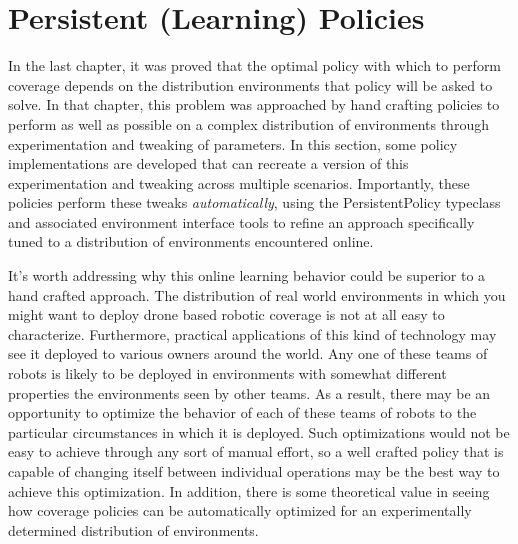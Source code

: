 
\section{Persistent (Learning) Policies}

In the last chapter, it was proved that the optimal policy with which to perform coverage depends on the distribution environments that policy will be asked to solve. In that chapter, this problem was approached by hand crafting policies to perform as well as possible on a complex distribution of environments through experimentation and tweaking of parameters. In this section, some policy implementations are developed that can recreate a version of this experimentation and tweaking across multiple scenarios. Importantly, these policies perform these tweaks \textit{automatically}, using the PersistentPolicy typeclass and associated environment interface tools to refine an approach specifically tuned to a distribution of environments encountered online.

It's worth addressing why this online learning behavior could be superior to a hand crafted approach. The distribution of real world environments in which you might want to deploy drone based robotic coverage is not at all easy to characterize. Furthermore, practical applications of this kind of  technology may see it deployed to various owners around the world. Any one of these teams of robots is likely to be deployed in environments with somewhat different properties the environments seen by other teams. As a result, there may be an opportunity to optimize the behavior of each of these teams of robots to the particular circumstances in which it is deployed. Such optimizations would not be easy to achieve through any sort of manual effort, so a well crafted policy that is capable of changing itself between individual operations may be the best way to achieve this optimization. In addition, there is some theoretical value in seeing how coverage policies can be automatically optimized for an experimentally determined distribution of environments.